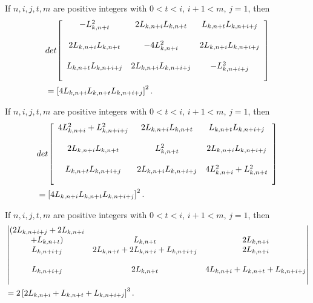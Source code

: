\begin{corollary}
If  $n, i, j, t, m$ are positive integers with $0 < t < i$, $i+1 < m$, $j = 1$, then
\begin{align*}
&det {\left[
          \begin{array}{ccc}
           \bigskip
            -L_{k, n+t}^2 & 2L_{k, n+i}L_{k, n+t} & L_{k, n+t}L_{k, n+i+j} \\
             \bigskip
            2L_{k, n+i}L_{k, n+t} & -  4 L_{k, n+i}^2& 2 L_{k, n+i}L_{k, n+i+j} \\
     \bigskip
             L_{k, n+t} L_{k, n+i+j}& 2 L_{k, n+i}L_{k, n+i+j} & - L_{k, n+i+j}^2\\       
          \end{array}
        \right]} \\&= \left[ 4 L_{k, n+i}L_{k, n+t}L_{k, n+i+j}\right]^2.
\end{align*}
\end{corollary}
\begin{corollary}
If  $n, i, j, t, m$ are positive integers with $0 < t < i$, $i+1 < m$, $j = 1$, then
\begin{align*}
&det {\left[
          \begin{array}{ccc}
           \bigskip
            4L_{k, n+i}^2+L_{k, n+i+j}^2 & 2L_{k, n+i}L_{k, n+t} & L_{k, n+t}L_{k, n+i+j} \\
             \bigskip
            2L_{k, n+i}L_{k, n+t} &  L_{k, n+t}^2& 2 L_{k, n+i}L_{k, n+i+j} \\
     \bigskip
             L_{k, n+t} L_{k, n+i+j}& 2 L_{k, n+i}L_{k, n+i+j} & 4 L_{k, n+i}^2+L_{k, n+t}^2\\       
          \end{array}
        \right]}\\& = \left[ 4 L_{k, n+i}L_{k, n+t}L_{k, n+i+j}\right]^2.
\end{align*}
\end{corollary}
\begin{corollary}
If  $n, i, j, t, m$ are positive integers with $0 < t < i$, $i+1 < m$, $j = 1$, then
\begin{align*}
&\begin{vmatrix}
            (2L_{k, n+i+j}+2L_{k, n+i}\\+L_{k, n+t})& L_{k, n+t} & 2L_{k, n+i} \\
             \bigskip
            L_{k, n+i+j}&  2L_{k, n+t}+2 L_{k, n+i}+L_{k, n+i+j}& 2 L_{k, n+i}\\
     \bigskip
             L_{k, n+i+j}& 2 L_{k, n+t} & 4 L_{k, n+i}+L_{k, n+t}+L_{k, n+i+j}\\       
  \end{vmatrix}        \\& =  2\left[ 2 L_{k, n+i}+L_{k, n+t}+L_{k, n+i+j}\right]^3.
\end{align*}
\end{corollary}
